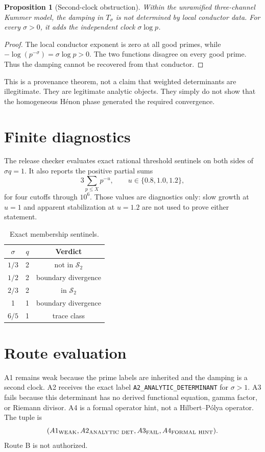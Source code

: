 \documentclass[11pt]{article}
\newtheorem{proposition}[theorem]{Proposition}
\theoremstyle{remark}\newtheorem{remark}[theorem]{Remark}
\begin{document}
\begin{proposition}[Second-clock obstruction]
Within the unramified three-channel Kummer model, the damping in
\(T_\sigma\) is not determined by local conductor data.  For every
\(\sigma>0\), it adds the independent clock \(\sigma\log p\).
\end{proposition}
\begin{proof}
The local conductor exponent is zero at all good primes, while
\(-\log(p^{-\sigma})=\sigma\log p>0\).  The two functions disagree on every
good prime.  Thus the damping cannot be recovered from that conductor.
\end{proof}

This is a provenance theorem, not a claim that weighted determinants are
illegitimate.  They are legitimate analytic objects.  They simply do not
show that the homogeneous H\'enon phase generated the required convergence.

\section{Finite diagnostics}
The release checker evaluates exact rational threshold sentinels on both
sides of \(\sigma q=1\).  It also reports the positive partial sums
\[
 3\sum_{p\le X}p^{-u},\qquad u\in\{0.8,1.0,1.2\},
\]
for four cutoffs through \(10^6\).  Those values are diagnostics only: slow
growth at \(u=1\) and apparent stabilization at \(u=1.2\) are not used to
prove either statement.

\begin{table}[h]
\centering
\caption{Exact membership sentinels.}
\begin{tabular}{ccc}
\toprule
\(\sigma\)&\(q\)&Verdict\\\midrule
\(1/3\)&2&not in \(\mathcal S_2\)\\
\(1/2\)&2&boundary divergence\\
\(2/3\)&2&in \(\mathcal S_2\)\\
1&1&boundary divergence\\
\(6/5\)&1&trace class\\
\bottomrule
\end{tabular}
\end{table}

\section{Route evaluation}
A1 remains weak because the prime labels are inherited and the damping is a
second clock.  A2 receives the exact label
\texttt{A2\_ANALYTIC\_DETERMINANT} for \(\sigma>1\).  A3 fails because this
determinant has no derived functional equation, gamma factor, or Riemann
divisor.  A4 is a formal operator hint, not a Hilbert--P\'olya operator.  The
tuple is
\[
(A1_{\rm WEAK},A2_{\rm ANALYTIC\ DET},A3_{\rm FAIL},A4_{\rm FORMAL\ HINT}).
\]
Route B is not authorized.
\end{document}
